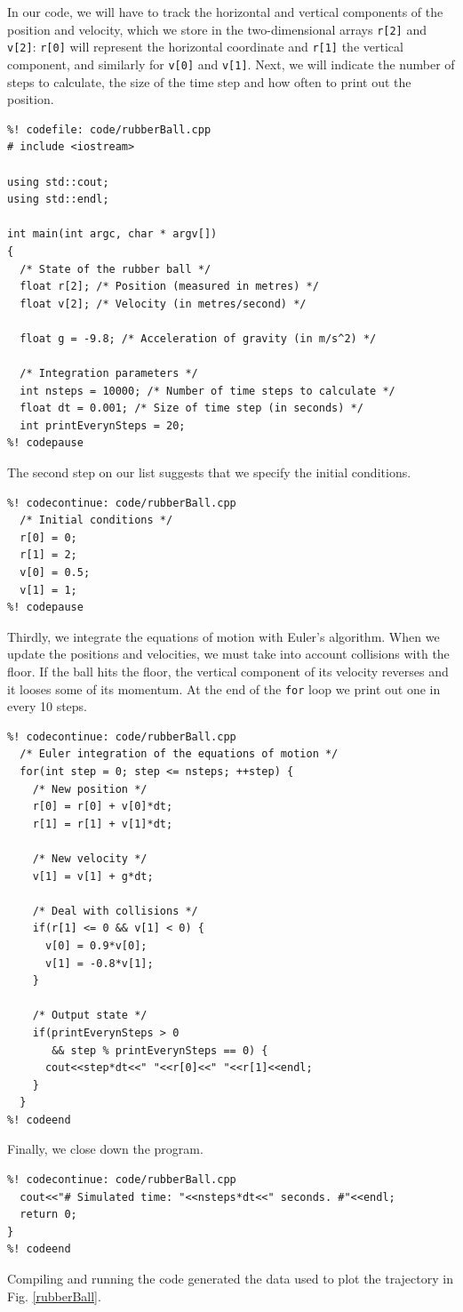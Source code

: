 In our code, we will have to track the horizontal and vertical components of
the position and velocity, which we store in the two-dimensional arrays
\texttt{r[2]} and \texttt{v[2]}: \texttt{r[0]} will represent the horizontal
coordinate and \texttt{r[1]} the vertical component, and similarly for
\texttt{v[0]} and \texttt{v[1]}. Next, we will indicate the number of steps to
calculate, the size of the time step and how often to print out the position.
\begin{lstlisting}
%! codefile: code/rubberBall.cpp
# include <iostream>

using std::cout;
using std::endl;

int main(int argc, char * argv[])
{
  /* State of the rubber ball */
  float r[2]; /* Position (measured in metres) */
  float v[2]; /* Velocity (in metres/second) */

  float g = -9.8; /* Acceleration of gravity (in m/s^2) */

  /* Integration parameters */
  int nsteps = 10000; /* Number of time steps to calculate */
  float dt = 0.001; /* Size of time step (in seconds) */
  int printEverynSteps = 20;
%! codepause
\end{lstlisting}
The second step on our list suggests that we specify the initial conditions.
\begin{lstlisting}
%! codecontinue: code/rubberBall.cpp
  /* Initial conditions */
  r[0] = 0;
  r[1] = 2;
  v[0] = 0.5;
  v[1] = 1;
%! codepause
\end{lstlisting}
Thirdly, we integrate the equations of motion with Euler's algorithm. When we
update the positions and velocities, we must take into account collisions with
the floor. If the ball hits the floor, the vertical component of its velocity
reverses and it looses some of its momentum. At the end of the \texttt{for}
loop we print out one in every 10 steps.
\begin{lstlisting}
%! codecontinue: code/rubberBall.cpp
  /* Euler integration of the equations of motion */
  for(int step = 0; step <= nsteps; ++step) {
    /* New position */
    r[0] = r[0] + v[0]*dt;
    r[1] = r[1] + v[1]*dt;

    /* New velocity */
    v[1] = v[1] + g*dt;

    /* Deal with collisions */
    if(r[1] <= 0 && v[1] < 0) {
      v[0] = 0.9*v[0];
      v[1] = -0.8*v[1];
    }

    /* Output state */
    if(printEverynSteps > 0
       && step % printEverynSteps == 0) {
      cout<<step*dt<<" "<<r[0]<<" "<<r[1]<<endl;
    }
  }
%! codeend
\end{lstlisting}
Finally, we close down the program.
\begin{lstlisting}
%! codecontinue: code/rubberBall.cpp
  cout<<"# Simulated time: "<<nsteps*dt<<" seconds. #"<<endl;
  return 0;
}
%! codeend
\end{lstlisting}
Compiling and running the code generated the data used to plot the trajectory
in Fig. \ref{rubberBall}.

